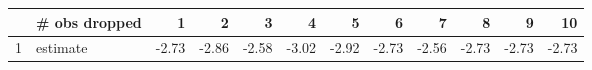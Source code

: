 \begin{tabular}{rlrrrrrrrrrr}
  \hline
 & \# obs dropped & 1 & 2 & 3 & 4 & 5 & 6 & 7 & 8 & 9 & 10 \\ 
  \hline
1 & estimate & -2.73 & -2.86 & -2.58 & -3.02 & -2.92 & -2.73 & -2.56 & -2.73 & -2.73 & -2.73 \\ 
   \hline
\end{tabular}
